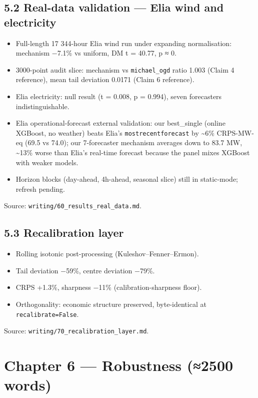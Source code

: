 \documentclass[11pt,a4paper,openany]{report}
\begin{document}
\subsection{5.2 Real-data validation — Elia wind and electricity}

\begin{itemize}
  \item Full-length 17 344-hour Elia wind run under expanding
    normalisation: mechanism −7.1\% vs uniform, DM t = 40.77, p ≈ 0.
  \item 3000-point audit slice: mechanism vs \texttt{michael\_ogd} ratio 1.003
    (Claim 4 reference), mean tail deviation 0.0171 (Claim 6
    reference).
  \item Elia electricity: null result (t = 0.008, p = 0.994), seven
    forecasters indistinguishable.
  \item Elia operational-forecast external validation: our best\_single
    (online XGBoost, no weather) beats Elia's \texttt{mostrecentforecast} by
    \textasciitilde{}6\% CRPS-MW-eq (69.5 vs 74.0); our 7-forecaster mechanism averages
    down to 83.7 MW, \textasciitilde{}13\% worse than Elia's real-time forecast because
    the panel mixes XGBoost with weaker models.
  \item Horizon blocks (day-ahead, 4h-ahead, seasonal slice) still in
    static-mode; refresh pending.
\end{itemize}

Source: \texttt{writing/60\_results\_real\_data.md}.

\subsection{5.3 Recalibration layer}

\begin{itemize}
  \item Rolling isotonic post-processing (Kuleshov–Fenner–Ermon).
  \item Tail deviation −59\%, centre deviation −79\%.
  \item CRPS +1.3\%, sharpness −11\% (calibration-sharpness floor).
  \item Orthogonality: economic structure preserved, byte-identical at
    \texttt{recalibrate=False}.
\end{itemize}

Source: \texttt{writing/70\_recalibration\_layer.md}.

\section{Chapter 6 — Robustness (≈2500 words)}
\end{document}
